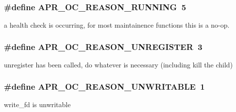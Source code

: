 \subsubsection[{\texorpdfstring{A\+P\+R\+\_\+\+O\+C\+\_\+\+R\+E\+A\+S\+O\+N\+\_\+\+R\+U\+N\+N\+I\+NG}{APR_OC_REASON_RUNNING}}]{\setlength{\rightskip}{0pt plus 5cm}\#define A\+P\+R\+\_\+\+O\+C\+\_\+\+R\+E\+A\+S\+O\+N\+\_\+\+R\+U\+N\+N\+I\+NG~5}\hypertarget{group___a_p_r___o_c_gaa4a7ca44f23d67e7e19fd59bf41abd6a}{}\label{group___a_p_r___o_c_gaa4a7ca44f23d67e7e19fd59bf41abd6a}
a health check is occurring, for most maintainence functions this is a no-\/op. 
\subsubsection[{\texorpdfstring{A\+P\+R\+\_\+\+O\+C\+\_\+\+R\+E\+A\+S\+O\+N\+\_\+\+U\+N\+R\+E\+G\+I\+S\+T\+ER}{APR_OC_REASON_UNREGISTER}}]{\setlength{\rightskip}{0pt plus 5cm}\#define A\+P\+R\+\_\+\+O\+C\+\_\+\+R\+E\+A\+S\+O\+N\+\_\+\+U\+N\+R\+E\+G\+I\+S\+T\+ER~3}\hypertarget{group___a_p_r___o_c_ga7fe88662b788e07800290f68575b2f4b}{}\label{group___a_p_r___o_c_ga7fe88662b788e07800290f68575b2f4b}
unregister has been called, do whatever is necessary (including kill the child) 
\subsubsection[{\texorpdfstring{A\+P\+R\+\_\+\+O\+C\+\_\+\+R\+E\+A\+S\+O\+N\+\_\+\+U\+N\+W\+R\+I\+T\+A\+B\+LE}{APR_OC_REASON_UNWRITABLE}}]{\setlength{\rightskip}{0pt plus 5cm}\#define A\+P\+R\+\_\+\+O\+C\+\_\+\+R\+E\+A\+S\+O\+N\+\_\+\+U\+N\+W\+R\+I\+T\+A\+B\+LE~1}\hypertarget{group___a_p_r___o_c_gae4cb4983512df7df00c9c0401efba9c9}{}\label{group___a_p_r___o_c_gae4cb4983512df7df00c9c0401efba9c9}
write\+\_\+fd is unwritable 
